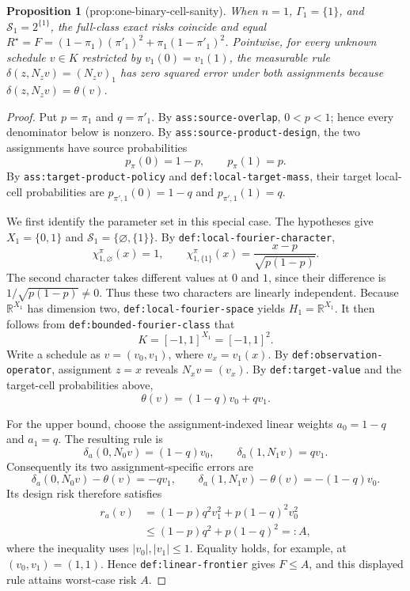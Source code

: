 \documentclass{article}
\newtheorem{proposition}{Proposition}
\begin{document}
\begin{proposition}[prop:one-binary-cell-sanity]\label{prop:one-binary-cell-sanity}
When \(n=1\), \(\Gamma_1=\{1\}\), and \(\mathcal S_1=2^{\{1\}}\), the full-class exact risks coincide and equal \(R^{\star}=F=(1-\pi_1)(\pi'_1)^2+\pi_1(1-\pi'_1)^2\). Pointwise, for every unknown schedule \(v\in K\) restricted by \(v_1(0)=v_1(1)\), the measurable rule \(\delta(z,N_zv)=(N_zv)_1\) has zero squared error under both assignments because \(\delta(z,N_zv)=\theta(v)\).
\end{proposition}
\begin{proof}
Put \(p=\pi_1\) and \(q=\pi'_1\). By \texttt{ass:source-overlap}, \(0<p<1\); hence every denominator below is nonzero. By \texttt{ass:source-product-design}, the two assignments have source probabilities
\[
p_{\pi}(0)=1-p,
\qquad
p_{\pi}(1)=p.
\]
By \texttt{ass:target-product-policy} and \texttt{def:local-target-mass}, their target local-cell probabilities are \(p_{\pi',1}(0)=1-q\) and \(p_{\pi',1}(1)=q\).

We first identify the parameter set in this special case. The hypotheses give \(X_1=\{0,1\}\) and \(\mathcal S_1=\{\varnothing,\{1\}\}\). By \texttt{def:local-fourier-character},
\[
\chi_{1,\varnothing}^{\pi}(x)=1,
\qquad
\chi_{1,\{1\}}^{\pi}(x)=\frac{x-p}{\sqrt{p(1-p)}}.
\]
The second character takes different values at \(0\) and \(1\), since their difference is \(1/\sqrt{p(1-p)}\ne0\). Thus these two characters are linearly independent. Because \(\mathbb R^{X_1}\) has dimension two, \texttt{def:local-fourier-space} yields \(H_1=\mathbb R^{X_1}\). It then follows from \texttt{def:bounded-fourier-class} that
\[
K=[-1,1]^{X_1}=[-1,1]^2.
\]
Write a schedule as \(v=(v_0,v_1)\), where \(v_x=v_1(x)\). By \texttt{def:observation-operator}, assignment \(z=x\) reveals \(N_xv=(v_x)\). By \texttt{def:target-value} and the target-cell probabilities above,
\[
\theta(v)=(1-q)v_0+qv_1.
\]

For the upper bound, choose the assignment-indexed linear weights \(a_0=1-q\) and \(a_1=q\). The resulting rule is
\[
\delta_a(0,N_0v)=(1-q)v_0,
\qquad
\delta_a(1,N_1v)=qv_1.
\]
Consequently its two assignment-specific errors are
\[
\delta_a(0,N_0v)-\theta(v)=-qv_1,
\qquad
\delta_a(1,N_1v)-\theta(v)=-(1-q)v_0.
\]
Its design risk therefore satisfies
\[
\begin{aligned}
r_a(v)
&=(1-p)q^2v_1^2+p(1-q)^2v_0^2\\
&\le (1-p)q^2+p(1-q)^2=:A,
\end{aligned}
\]
where the inequality uses \(|v_0|,|v_1|\le1\). Equality holds, for example, at \((v_0,v_1)=(1,1)\). Hence \texttt{def:linear-frontier} gives \(F\le A\), and this displayed rule attains worst-case risk \(A\).


\end{proof}
\end{document}
